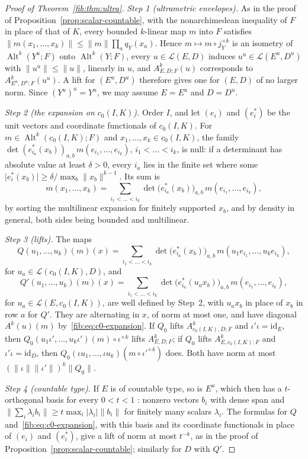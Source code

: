 \documentclass[11pt]{amsart}
\theoremstyle{definition}
\theoremstyle{remark}
\numberwithin{equation}{section}
\newcommand{\cL}{\mathcal L}
\newcommand{\Alt}{\operatorname{Alt}}
\newcommand{\id}{\mathrm{id}}
\newcommand{\abs}[1]{\lvert #1\rvert}
\newcommand{\norm}[1]{\lVert #1\rVert}
\theoremstyle{plain}
\theoremstyle{definition}
\theoremstyle{plain}
\begin{document}
\begin{proof}[Proof of Theorem~\ref{fib:thm:ultra}]
\emph{Step 1 (ultrametric envelopes).} As in the proof of Proposition~\ref{prop:scalar-countable}, with the
nonarchimedean inequality of $F$ in place of that of $K$, every bounded $k$\nobreakdash-linear map $m$ into $F$ satisfies
$\norm{m(x_1,\dots,x_k)}\le\norm m\prod_aq_Y(x_a)$. Hence $m\mapsto m\circ j_Y^{\times k}$ is an isometry of
$\Alt^k(Y^u;F)$ onto $\Alt^k(Y;F)$, every $u\in\cL(E,D)$ induces $u^u\in\cL(E^u,D^u)$ with $\norm{u^u}\le\norm u$,
linearly in $u$, and $A^k_{E,D;F}(u)$ corresponds to $A^k_{E^u,D^u;F}(u^u)$. A lift for $(E^u,D^u)$ therefore gives one
for $(E,D)$ of no larger norm. Since $(Y^u)^u=Y^u$, we may assume $E=E^u$ and $D=D^u$.

\emph{Step 2 (the expansion on $c_0(I,K)$).} Order $I$, and let $(e_i)$ and $(e^*_i)$ be the unit vectors and
coordinate functionals of $c_0(I,K)$. For $m\in\Alt^k(c_0(I,K);F)$ and $x_1,\dots,x_k\in c_0(I,K)$, the family
$\det(e^*_{i_a}(x_b))_{a,b}\,m(e_{i_1},\dots,e_{i_k})$, $i_1<\dots<i_k$, is null: if a determinant has absolute value at
least $\delta>0$, every $i_a$ lies in the finite set where some $\abs{e^*_i(x_b)}\ge\delta/\max_b\norm{x_b}^{k-1}$. Its
sum is
\begin{equation}\label{fib:eq:c0-expansion}
 m(x_1,\dots,x_k)=\sum_{i_1<\dots<i_k}\det\bigl(e^*_{i_a}(x_b)\bigr)_{a,b}\,m(e_{i_1},\dots,e_{i_k}),
\end{equation}
by sorting the multilinear expansion for finitely supported $x_b$, and by density in general, both sides being bounded
and multilinear.

\emph{Step 3 (lifts).} The maps
\[
 Q(u_1,\dots,u_k)(m)(x)=\sum_{i_1<\dots<i_k}\det\bigl(e^*_{i_a}(x_b)\bigr)_{a,b}\,m(u_1e_{i_1},\dots,u_ke_{i_k}),
\]
for $u_a\in\cL(c_0(I,K),D)$, and
\[
 Q'(u_1,\dots,u_k)(m)(x)=\sum_{i_1<\dots<i_k}\det\bigl(e^*_{i_a}(u_ax_b)\bigr)_{a,b}\,m(e_{i_1},\dots,e_{i_k}),
\]
for $u_a\in\cL(E,c_0(I,K))$, are well defined by Step~2, with $u_ax_b$ in place of $x_b$ in row $a$ for $Q'$. They are
alternating in $x$, of norm at most one, and have diagonal $A^k(u)(m)$ by~\eqref{fib:eq:c0-expansion}. If $Q_0$ lifts
$A^k_{c_0(I,K),D;F}$ and $\iota'\iota=\id_E$, then $Q_0(u_1\iota',\dots,u_k\iota')(m)\circ\iota^{\times k}$ lifts
$A^k_{E,D;F}$; if $Q_0$ lifts $A^k_{E,c_0(I,K);F}$ and $\iota'\iota=\id_D$, then
$Q_0(\iota u_1,\dots,\iota u_k)(m\circ\iota'^{\times k})$ does. Both have norm at most
$(\norm\iota\norm{\iota'})^k\norm{Q_0}$.

\emph{Step 4 (countable type).} If $E$ is of countable type, so is $E^u$, which then has a $t$\nobreakdash-orthogonal
basis for every $0<t<1$ \cite[Proposition~1.4]{VdP}: nonzero vectors $b_i$ with dense span and
$\norm{\sum_i\lambda_ib_i}\ge t\max_i\abs{\lambda_i}\norm{b_i}$ for finitely many scalars $\lambda_i$. The formulas for
$Q$ and~\eqref{fib:eq:c0-expansion}, with this basis and its coordinate functionals in place of $(e_i)$ and $(e^*_i)$,
give a lift of norm at most $t^{-k}$, as in the proof of Proposition~\ref{prop:scalar-countable}; similarly for $D$
with $Q'$.
\end{proof}
\end{document}
